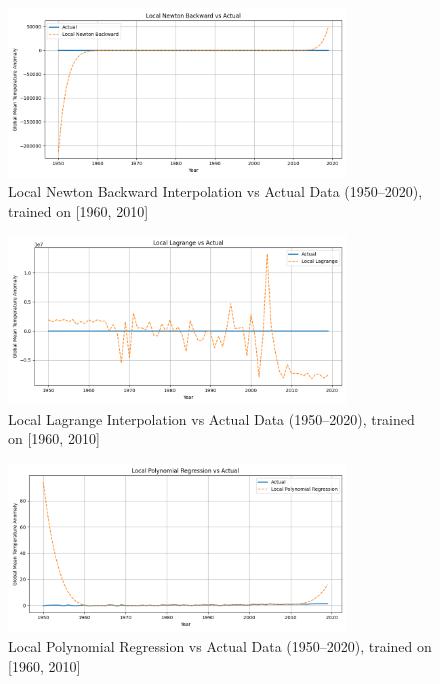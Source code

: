 \begin{figure}[htbp]
    \centering
    \includegraphics[width=0.8\textwidth]{../figs/Local_Newton_Backward_vs_actual[1960, 2010, 1].png}
    \caption{Local Newton Backward Interpolation vs Actual Data (1950--2020), trained on [1960, 2010]}
    \label{fig:backward2}
\end{figure}

\begin{figure}[htbp]
    \centering
    \includegraphics[width=0.8\textwidth]{../figs/Local_Lagrange_vs_actual[1960, 2010, 1].png}
    \caption{Local Lagrange Interpolation vs Actual Data (1950--2020), trained on [1960, 2010]}
    \label{fig:lagrange2}
\end{figure}

\begin{figure}[htbp]
    \centering
    \includegraphics[width=0.8\textwidth]{../figs/Local_Polynomial_Regression_vs_actual[1960, 2010, 1].png}
    \caption{Local Polynomial Regression vs Actual Data (1950--2020), trained on [1960, 2010]}
    \label{fig:regression2}
\end{figure}

